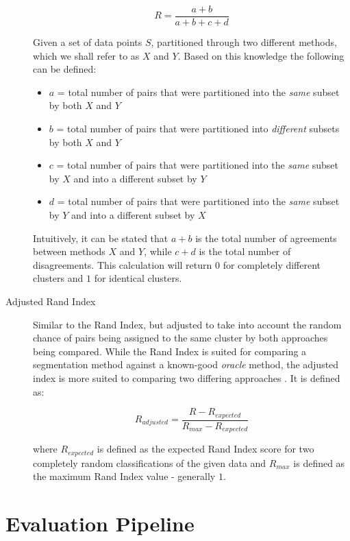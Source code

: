 \documentclass{uvamscse}	%
\begin{document}
\begin{description}
	\begin{equation}
		R = \frac{a+b}{a+b+c+d}
	\end{equation}
	
	Given a set of data points $S$, partitioned through two different methods, which we shall refer to as $X$ and $Y$. Based on this knowledge the following can be defined:
	
	\begin{itemize}
		\item $a$ = total number of pairs that were partitioned into the \emph{same} subset by both $X$ and $Y$
		\item $b$ = total number of pairs that were partitioned into \emph{different} subsets by both $X$ and $Y$
		\item $c$ = total number of pairs that were partitioned into the \emph{same} subset by $X$ and into a different subset by $Y$
		\item $d$ = total number of pairs that were partitioned into the \emph{same} subset by $Y$ and into a different subset by $X$
	\end{itemize}
	
	Intuitively, it can be stated that $a+b$ is the total number of agreements between methods $X$ and $Y$, while $c+d$ is the total number of disagreements. This calculation will return $0$ for completely different clusters and $1$ for identical clusters.
	
	\item[Adjusted Rand Index]Similar to the Rand Index, but adjusted to take into account the random chance of pairs being assigned to the same cluster by both approaches being compared. While the Rand Index is suited for comparing a segmentation method against a known-good \emph{oracle} method, the adjusted index is more suited to comparing two differing approaches \cite{Matteson2012}. It is defined as:
	
	\begin{equation}
	    R_{adjusted} = \frac{R - R_{expected}}{R_{max} - R_{expected}}
	\end{equation}
	
	where $R_{expected}$ is defined as the expected Rand Index score for two completely random classifications of the given data and $R_{max}$ is defined as the maximum Rand Index value - generally $1$.

\end{description}

\section{Evaluation Pipeline}
\end{document}
